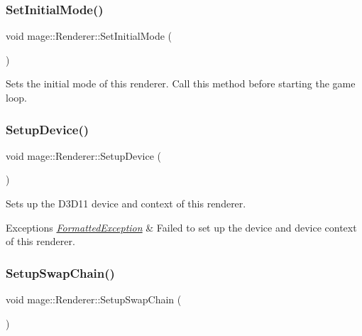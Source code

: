 \subsubsection{\texorpdfstring{Set\+Initial\+Mode()}{SetInitialMode()}}
{\footnotesize\ttfamily void mage\+::\+Renderer\+::\+Set\+Initial\+Mode (\begin{DoxyParamCaption}{ }\end{DoxyParamCaption})\hspace{0.3cm}{\ttfamily [noexcept]}}

Sets the initial mode of this renderer. Call this method before starting the game loop. \hypertarget{classmage_1_1_renderer_aedf5e2e3f73d3d05c09c5fc9f8ac06c3}{}\label{classmage_1_1_renderer_aedf5e2e3f73d3d05c09c5fc9f8ac06c3} 
\subsubsection{\texorpdfstring{Setup\+Device()}{SetupDevice()}}
{\footnotesize\ttfamily void mage\+::\+Renderer\+::\+Setup\+Device (\begin{DoxyParamCaption}{ }\end{DoxyParamCaption})\hspace{0.3cm}{\ttfamily [private]}}

Sets up the D3\+D11 device and context of this renderer.


\begin{DoxyExceptions}{Exceptions}
{\em \hyperlink{structmage_1_1_formatted_exception}{Formatted\+Exception}} & Failed to set up the device and device context of this renderer. \\
\hline
\end{DoxyExceptions}
\hypertarget{classmage_1_1_renderer_a8d3030611390f69120f1e5b91225eddf}{}\label{classmage_1_1_renderer_a8d3030611390f69120f1e5b91225eddf} 
\subsubsection{\texorpdfstring{Setup\+Swap\+Chain()}{SetupSwapChain()}}
{\footnotesize\ttfamily void mage\+::\+Renderer\+::\+Setup\+Swap\+Chain (\begin{DoxyParamCaption}{ }\end{DoxyParamCaption})\hspace{0.3cm}{\ttfamily [private]}}


